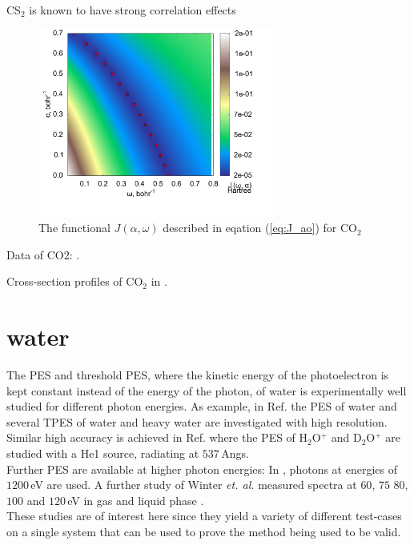 CS$_2$ is known to have strong correlation effects \cite{2phcederbaum}
\begin{figure}
\includegraphics[width=0.69\textwidth]{Figures/CO2_J0_2D_terrain}
\caption{The functional $J(\alpha,\omega)$ described in eqation (\ref{eq:J_ao}) for CO$_2$}
\label{fig:CO2-otrsh}
\end{figure}

Data of CO2: \cite{DiffLinear}.

Cross-section profiles of CO$_2$ in \cite{stieltje}.

\section{water}
The PES and threshold PES, where the kinetic energy of the photoelectron is kept constant instead of the energy of the photon, of water is experimentally well studied 
for different photon energies.
As example, in Ref. \cite{waterTPE} the PES of water and several TPES of water and heavy water are investigated with high resolution.\\
Similar high accuracy is achieved in Ref. \cite{waterHePES} where the PES of H$_2$O$^+$ and D$_2$O$^+$ are studied with a He1 source, radiating at $537\,$Angs.\\
Further PES are available at higher photon energies:
In \cite{water1200}, photons at energies of $1200\,$eV are used.
A further study of Winter \textit{et. al.} measured spectra at $60$, $75$ $80$, $100$ and $120\,$eV in gas and liquid phase \cite{winterWater}.\\
These studies are of interest here since they yield a variety of different test-cases on a single system that can be used to prove the method being used to be valid.
